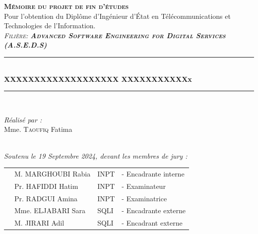 \vspace{0.5cm}
\begin{center}
{\large \textsc{\textbf{Mémoire du projet de fin d'études}}}\\[0.1cm]
{\large {Pour l’obtention du Diplôme d’Ingénieur d’État en Télécommunications 
et Technologies de l’Information.}}\\[0.1cm]
{\large \textsc{\textit{Filière:\textbf{ Advanced Software Engineering for Digital Services (A.S.E.D.S)}}}} \\[0.05cm] 
\vspace{0.5cm}
\vspace{-0.04cm}
\rule{\linewidth}{0.3mm} \\[0.4cm]   %
 { \huge \textbf{XXXXXXXXXXXXXXXXXXX XXXXXXXXXXXx}} \\[0.15cm] 
\rule{\linewidth}{0.3mm} \\[0.4cm]



\vspace{1cm}

\noindent
\begin{minipage}{0.9\textwidth}
    \vspace{-7mm}
  \begin{flushleft} \large
    \emph{Réalisé par :}\\
    Mme. \textsc{Taoufiq} Fatima %
  \end{flushleft}
\end{minipage}
\begin{minipage}{0.4\textwidth}

\end{minipage}\\[0.4cm]

{\large \textit{Soutenu le 19 Septembre 2024, devant les membres de jury : }}\\[0.3cm]


\begin{tabular}{p{1cm}lll}
  & \large M. MARGHOUBI Rabia & \large INPT & \large - Encadrante interne  \\[0.1cm]
  & \large Pr. HAFIDDI Hatim & \large INPT & \large - Examinateur \\[0.1cm]
  & \large Pr. RADGUI Amina & \large INPT & \large - Examinatrice  \\[0.1cm]
  & \large Mme. ELJABARI Sara & \large SQLI & \large - Encadrante externe  \\[0.1cm]
  & \large M. JIRARI Adil & \large SQLI & \large - Encadrant externe  \\[0.1cm]



\end{tabular}
\end{center}
